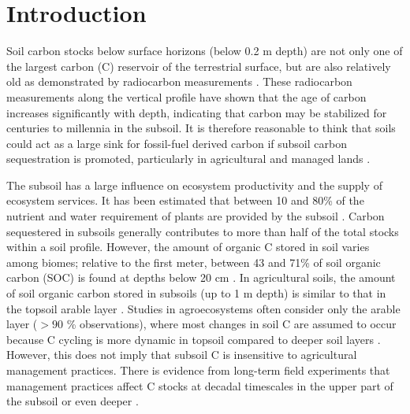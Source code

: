 \documentclass[11pt, oneside, a4paper]{article}   	%
\begin{document}
\tableofcontents

\newpage

\section{Introduction}
Soil carbon stocks below surface horizons (below  0.2 m depth) are not only one of the largest carbon (C) reservoir of the terrestrial surface, but are also relatively old as demonstrated by radiocarbon measurements \citep{Mathieu2015, He2016, Shi2020, Heckman2022}. These radiocarbon measurements along the vertical profile have shown that the age of carbon increases significantly with depth, indicating that carbon may be stabilized for centuries to millennia in the subsoil. It is therefore reasonable to think that soils could act as a large sink for fossil-fuel derived carbon if subsoil carbon sequestration is promoted, particularly in agricultural and managed lands \citep{Button2022}. 

The subsoil has a large influence on ecosystem productivity and the supply of ecosystem services. It has been estimated that between 10 and 80\% of the nutrient and water requirement of plants are provided by the subsoil \citep{Hinzmann2021}. Carbon sequestered in subsoils generally contributes to more than half of the total stocks within a soil profile. However, the amount of organic C stored in soil varies among biomes; relative to the first meter, between 43 and 71\% of soil organic carbon (SOC) is found at depths below 20 cm \citep{Jobbagy2000}. In agricultural soils, the amount of soil organic carbon stored in subsoils (up to 1 m depth) is similar to that in the topsoil arable layer \citep{Morari2019}. Studies in agroecosystems often consider only the arable layer ($>90$ \% observations), where most changes in soil C are assumed to occur because C cycling is more dynamic in topsoil compared to deeper soil layers \citep{Bolinder2020}. However, this does not imply that subsoil C is insensitive to agricultural management practices. There is evidence from long-term field experiments that management practices affect C stocks at decadal timescales in the upper part of the subsoil or even deeper \citep[e.g.][]{Kirchmann2013, Kaetterer2014, Menichetti2015, Borjesson2018, DalFerro2020, Slessarev2020}.
\end{document}

